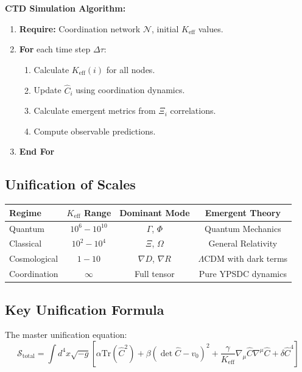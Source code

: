 \documentclass[11pt,a4paper]{article}
\begin{document}
\textbf{CTD Simulation Algorithm:}
\begin{enumerate}
	\item \textbf{Require:} Coordination network $\mathcal{N}$, initial $K_{\mathrm{eff}}$ values.
	\item \textbf{For} each time step $\Delta\tau$:
	\begin{enumerate}
		\item Calculate $K_{\mathrm{eff}}(i)$ for all nodes.
		\item Update $\hat{C}_i$ using coordination dynamics.
		\item Calculate emergent metrics from $\Xi_i$ correlations.
		\item Compute observable predictions.
	\end{enumerate}
	\item \textbf{End For}
\end{enumerate}

\subsection{Unification of Scales}

\begin{table}[htbp]
	\centering
	\begin{tabular}{lccc}
		\toprule
		\textbf{Regime} & \textbf{$K_{\mathrm{eff}}$ Range} & \textbf{Dominant Mode} & \textbf{Emergent Theory} \\
		\midrule
		Quantum & $10^6-10^{10}$ & $\Gamma$, $\Phi$ & Quantum Mechanics \\
		Classical & $10^2-10^4$ & $\Xi$, $\Omega$ & General Relativity \\
		Cosmological & $1-10$ & $\nabla D$, $\nabla R$ & $\Lambda$CDM with dark terms \\
		Coordination & $\infty$ & Full tensor & Pure YPSDC dynamics \\
		\bottomrule
	\end{tabular}
\end{table}

\subsection{Key Unification Formula}

The master unification equation:
\[
\boxed{\mathcal{S}_{\mathrm{total}} = \int d^{4}x \sqrt{-g} \left[ \alpha \mathrm{Tr}(\hat{C}^2) + \beta (\det\hat{C} - v_0)^2 + \frac{\gamma}{K_{\mathrm{eff}}} \nabla_\mu\hat{C}\nabla^\mu\hat{C} + \delta \hat{C}^4 \right]}
\]
\end{document}
